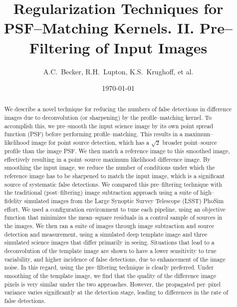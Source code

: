 \documentclass[iop]{emulateapj}
\begin{document}
\title{Regularization Techniques for PSF--Matching Kernels. II. Pre--Filtering of Input Images}

\author{
A.C.~Becker,
R.H.~Lupton,
K.S.~Krughoff,
et al.
}

\date{\today}

\begin{abstract}

We describe a novel technique for reducing the numbers of false detections in difference images due to deconvolution (or sharpening) by the profile--matching kernel.
To accomplish this, we pre--smooth the input science image by its own point spread function (PSF) before performing profile--matching.
This results in a maximum--likelihood image for point source detection, which has a $\sqrt{2}$ broader point--source profile than the image PSF.
We then match a reference image to this smoothed image, effectively resulting in a point--source maximum likelihood difference image.
By smoothing the input image, we reduce the number of conditions under which the reference image has to be sharpened to match the input image, which is a significant source of systematic false detections.
We compared this pre--filtering technique with the traditional (post--filtering) image subtraction approach using a suite of high--fidelity simulated images from the Large Synoptic Survey Telescope (LSST) PhoSim effort.
We used a configuration environment to tune each pipeline, using an objective function that minimizes the mean--square residuals in a control sample of sources in the images.
We then ran a suite of images through image subtraction and source detection and measurement, using a simulated deep template image and three simulated science images that differ primarily in seeing.
Situations that lead to a deconvolution of the template image are shown to have a lower sensitivity to true variability, and higher incidence of false detections, due to enhancement of the image noise.
In this regard, using the pre--filtering technique is clearly preferred.
Under smoothing of the template image, we find that the quality of the difference image pixels is very similar under the two approaches.
However, the propagated per--pixel variance varies significantly at the detection stage, leading to differences in the rate of false detections.

\end{abstract}
\end{document}
